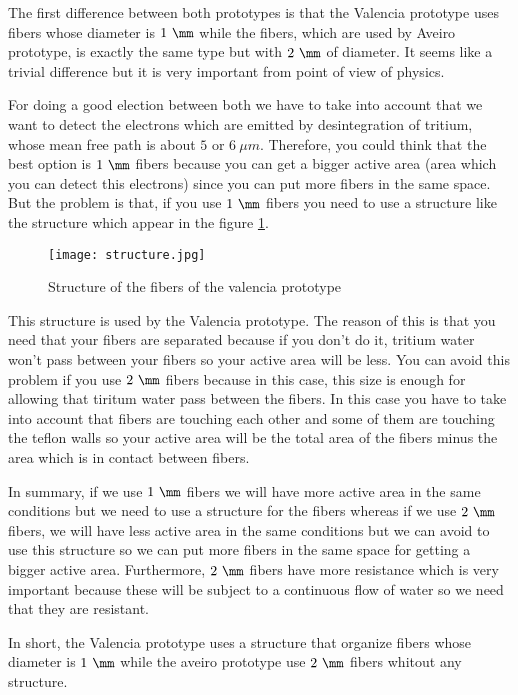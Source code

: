 The first difference between both prototypes is that the Valencia prototype uses fibers whose diameter is $1~\mm$ while the fibers, which are used by Aveiro prototype, is exactly the same type but with $2~\mm$ of diameter. It seems like a trivial difference but it is very important from point of view of physics. 

For doing a good election between both we have to take into account that we want to detect the electrons which are emitted by desintegration of tritium, whose mean free path is about $5$ or $6~\mu m$. Therefore, you could think that the best option is $1~\mm$ fibers because you can get a bigger active area (area which you can detect this electrons) since you can put more fibers in the same space. But the problem is that, if you use $1~\mm$ fibers you need to use a structure like the structure which appear in the figure \ref{structure}. 

\begin{figure}[hbtp]
\centering
\texttt{[image: structure.jpg]}
\caption{Structure of the fibers of the valencia prototype \label{structure}}
\end{figure}


This structure is used by the Valencia prototype. The reason of this is that you need that your fibers are separated because if you don't do it, tritium water won't pass between your fibers so your active area will be less. You can avoid this problem if you use $2~\mm$ fibers because in this case, this size is enough for allowing that tiritum water pass between the fibers. In this case you have to take into account that fibers are touching each other and some of them are touching the teflon walls so your active area will be the total area of the fibers minus the area which is in contact between fibers.

In summary, if we use $1~\mm$ fibers we will have more active area in the same conditions but we need to use a structure for the fibers whereas if we use $2~\mm$ fibers, we will have less active area in the same conditions but we can avoid to use this structure so we can put more fibers in the same space for getting a bigger active area. Furthermore, $2~\mm$ fibers have more resistance which is very important because these will be subject to a continuous flow of water so we need that they are resistant.

In short, the Valencia prototype uses a structure that organize fibers whose diameter is $1~\mm$ while the aveiro prototype use $2~\mm$ fibers whitout any structure.

